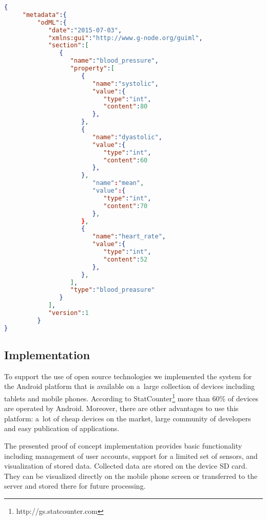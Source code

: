 \documentclass[a4paper,twoside]{article}
\begin{document}
\begin{lstlisting}[language=json,caption=blood pressure example, label=odml_example]
{
     "metadata":{
         "odML":{
            "date":"2015-07-03",
            "xmlns:gui":"http://www.g-node.org/guiml",
            "section":[
               {
                  "name":"blood_pressure",
                  "property":[
                     {
                        "name":"systolic",
                        "value":{
                           "type":"int",
                           "content":80
                        },
                     },
                     {
                        "name":"dyastolic",
                        "value":{
                           "type":"int",
                           "content":60
                        },
                     },
                        "name":"mean",
                        "value":{
                           "type":"int",
                           "content":70
                        },
                     },
                     {
                        "name":"heart_rate",
                        "value":{
                           "type":"int",
                           "content":52
                        },
                     },
                  ],
                  "type":"blood_preasure"
               }
            ],
            "version":1
         }
}
\end{lstlisting}

\subsection{Implementation}

To support the use of open source technologies we implemented the system for the Android platform that is available on a~large collection of devices including tablets and mobile phones. According to StatCounter\footnote{http://gs.statcounter.com} more than 60\% of devices are operated by Android. Moreover, there are other advantages to use this platform: a~lot of cheap devices on the market, large community of developers and easy publication of applications.

The presented proof of concept implementation provides basic functionality including management of user accounts, support for a limited set of sensors, and visualization of stored data. Collected data are stored on the device SD card. They can be visualized directly on the mobile phone screen or transferred to the server and stored there for future processing.
\end{document}
